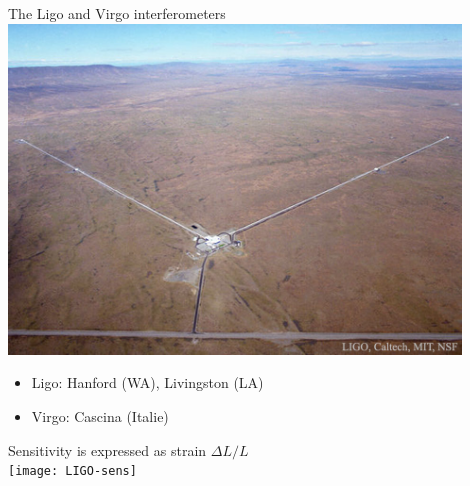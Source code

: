 \newpage
%
\begin{center}
{\blue The Ligo and Virgo interferometers}\\[3mm]
\includegraphics[keepaspectratio,width=12cm]{hanford-ligo}
\end{center}
%
\begin{itemize}
\item[] Ligo: Hanford (WA), Livingston (LA)
\item[] Virgo: Cascina (Italie)
\end{itemize}

\Tr
\onecolumn
%
\begin{center}
{\blue Sensitivity is expressed as strain $\Delta L/L$}\\[1mm]
\texttt{[image: LIGO-sens]}
\end{center}

